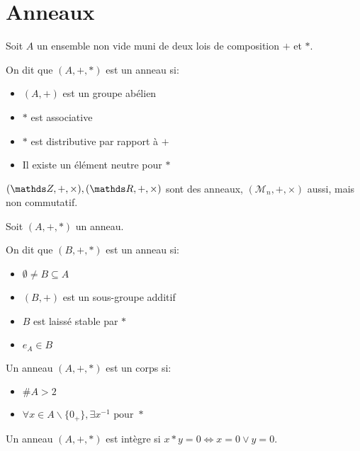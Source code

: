 \section{Anneaux}
  \begin{definition}[Anneau]
    Soit $A$ un ensemble non vide muni de deux lois de composition $+$ et $*$.

    On dit que $(A,+,*)$ est un anneau si: \begin{itemize}
      \item $(A,+)$ est un groupe abélien
      \item $*$ est associative
      \item $*$ est distributive par rapport à $+$
      \item Il existe un élément neutre pour $*$
    \end{itemize}
  \end{definition}

  $(\ZZ,+,\times), (\RR,+,\times)$ sont des anneaux,
  $(\mathcal{M}_n, +,\times)$ aussi, mais non commutatif.


  \begin{definition}
    Soit $(A,+,*)$ un anneau.

    On dit que $(B,+,*)$ est un anneau si: \begin{itemize}
      \item $\emptyset \neq B \subseteq A$
      \item $(B,+)$ est un sous-groupe additif
      \item $B$ est laissé stable par $*$
      \item $e_A \in B$
    \end{itemize}
  \end{definition}


  \begin{definition}[Corps]
    Un anneau $(A,+,*)$ est un corps si:\begin{itemize}
      \item $\#A>2$
      \item $\forall x\in A\backslash \{ 0_+\}, \exists x^{-1} \text{ pour } *$
    \end{itemize}
  \end{definition}


  \begin{definition}[Intégrité]
    Un anneau $(A,+,*)$ est intègre si $x*y=0 \iff x=0\vee y=0$.
  \end{definition}


